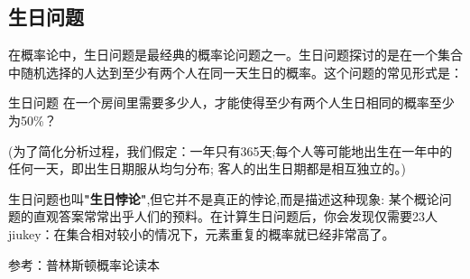 
\subsection{生日问题}

在概率论中，生日问题是最经典的概率论问题之一。生日问题探讨的是在一个集合中随机选择的人达到至少有两个人在同一天生日的概率。这个问题的常见形式是：

\begin{example}{生日问题}
在一个房间里需要多少人，才能使得至少有两个人生日相同的概率至少为50\%？

(为了简化分析过程，我们假定：一年只有365天;每个人等可能地出生在一年中的任何一天，即出生日期服从均匀分布; 客人的出生日期都是相互独立的。)
\end{example}


 

生日问题也叫\textbf{"生日悖论"},但它并不是真正的悖论,而是描述这种现象: 某个概论问题的直观答案常常出乎人们的预料。在计算生日问题后，你会发现仅需要23人jiukey：在集合相对较小的情况下，元素重复的概率就已经非常高了。


参考：普林斯顿概率论读本